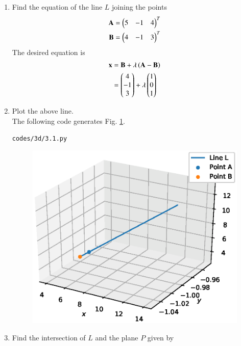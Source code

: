 \renewcommand{\theequation}{\theenumi}
\begin{enumerate}[label=\arabic*.,ref=\thesubsection.\theenumi]

%
\item Find the equation of the line $L$ joining the points 
\begin{align}
\mathbf{A}=\begin{pmatrix}5 & -1 &4\end{pmatrix}^T
\\
\mathbf{B}=\begin{pmatrix}4 & -1 & 3\end{pmatrix}^T
\end{align}
\solution The desired equation is
\begin{align}
\mathbf{x} &= \mathbf{B} + \lambda\left(\mathbf{A}-\mathbf{B}\right)
\\
&= \begin{pmatrix}4 \\ -1 \\ 3\end{pmatrix} + \lambda \begin{pmatrix}1 \\ 0 \\ 1\end{pmatrix}
\label{eq:Lproj}
\end{align}
\item Plot the above line. 
\\
\solution The following code generates Fig. \ref{fig:3.1}.
\begin{lstlisting}
codes/3d/3.1.py
\end{lstlisting}
\begin{figure}[!ht]
\centering
\includegraphics[width=\columnwidth]{./3d/figs/3.1.eps}
\caption{}
\label{fig:3.1}
\end{figure}
\item Find the intersection of $L$ and the plane $P$ given by

\end{enumerate}
